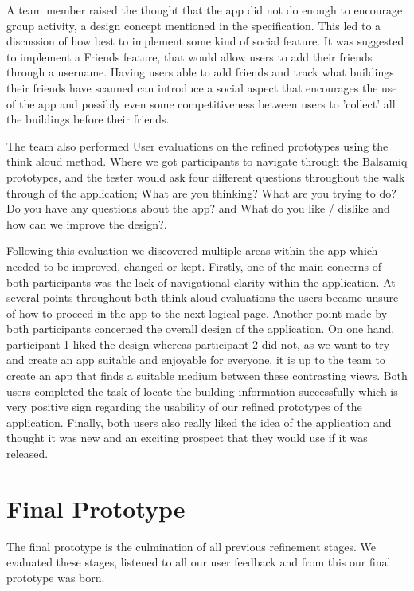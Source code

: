 \documentclass[a4,10pt,twocolumn]{article}
\begin{document}
A team member raised the thought that the app did not do enough to encourage group activity, a design concept mentioned in the specification. This led to a discussion of how best to implement some kind of social feature. It was suggested to implement a Friends feature, that would allow users to add their friends through a username. Having users able to add friends and track what buildings their friends have scanned can introduce a social aspect that encourages the use of the app and possibly even some competitiveness between users to 'collect' all the buildings before their friends.

The team also performed User evaluations on the refined prototypes using the think aloud method. Where we got participants to navigate through the Balsamiq prototypes, and the tester would ask four different questions throughout the walk through of the application; What are you thinking? What are you trying to do? Do you have any questions about the app? and What do you like / dislike and how can we improve the design?.

Following this evaluation we discovered multiple areas within the app which needed to be improved, changed or kept. 
Firstly, one of the main concerns of both participants was the lack of navigational clarity within the application. At several points throughout both think aloud evaluations the users became unsure of how to proceed in the app to the next logical page. 
Another point made by both participants concerned the overall design of the application. On one hand, participant 1 liked the design whereas participant 2 did not, as we want to try and create an app suitable and enjoyable for everyone, it is up to the team to create an app that finds a suitable medium between these contrasting views. 
Both users completed the task of locate the building information successfully which is very positive sign regarding the usability of our refined prototypes of the application. 
Finally, both users also really liked the idea of the application and thought it was new and an exciting prospect that they would use if it was released.

\section{Final Prototype}
The final prototype is the culmination of all previous refinement stages. We evaluated these stages, listened to all our user feedback and from this our final prototype was born.
\end{document}

